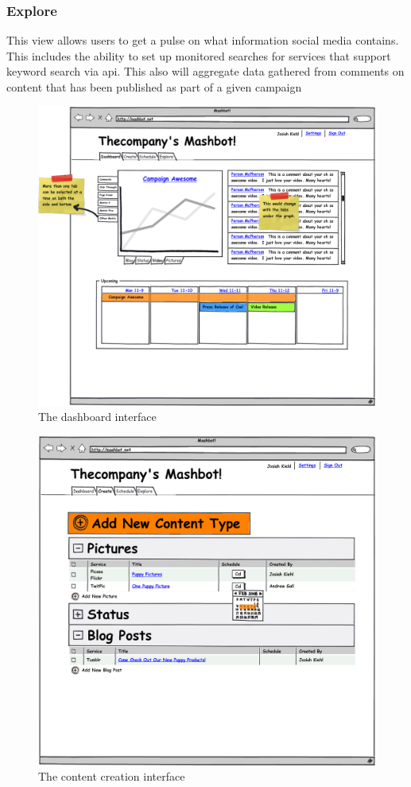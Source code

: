 \documentclass{report}
\begin{document}
\subsubsection{Explore}
This view allows users to get a pulse on what information social media
contains.  This includes the ability to set up monitored searches for
services that support keyword search via api.  This also will
aggregate data gathered from comments on content that has been
published as part of a given campaign
\clearpage
\begin{figure}
\centering
\includegraphics[scale=0.35]{../mockups/dashboard.png}
\caption{The dashboard interface}
\label{dashboard}
\end{figure}
\clearpage
\begin{figure}
\centering
\includegraphics[scale=0.35]{../mockups/create.png}
\caption{The content creation interface}
\label{create}
\end{figure}
\end{document}
